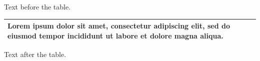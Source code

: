 \documentclass[12pt]{article}
\begin{document}
Text before the table.

\begin{tabular}{|p{6cm}|}\hline Lorem ipsum dolor sit amet, consectetur adipiscing elit, sed do eiusmod tempor incididunt ut labore et dolore magna aliqua.\\\hline\end{tabular}

Text after the table.
\end{document}
